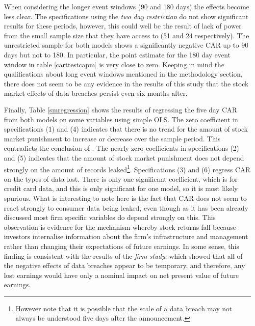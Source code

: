 \documentclass[../Main.tex]{subfiles}
\begin{document}
When considering the longer event windows (90 and 180 days) the effects become less clear. The specifications using the \textit{two day restriction} do not show significant results for these periods, however, this could well be the result of lack of power from the small sample size that they have access to (51 and 24 respectively). The unrestricted sample for both models shows a significantly negative CAR up to 90 days but not to 180. In particular, the point estimate for the 180 day event window in table \ref{carttestcapm} is very close to zero. Keeping in mind the qualifications about long event windows mentioned in the methodology section, there does not seem to be any evidence in the results of this study that the stock market effects of data breaches persist even six months after.

Finally, Table \ref{smregression} shows the results of regressing the five day CAR from both models on some variables using simple OLS. The zero coefficient in specifications (1) and (4) indicates that there is no trend for the amount of stock market punishment to increase or decrease over the sample period. This contradicts the conclusion of \cite{gordon2011}. The nearly zero coefficients in specifications (2) and (5) indicates that the amount of stock market punishment does not depend strongly on the amount of records leaked\footnote{However note that it is possible that the scale of a data breach may not always be understood five days after the announcement.}. Specifications (3) and (6) regress CAR on the types of data lost. There is only one significant coefficient, which is for credit card data, and this is only significant for one model, so it is most likely spurious. What is interesting to note here is the fact that CAR does not seem to react strongly to consumer data being leaked, even though as it has been already discussed most firm specific variables do depend strongly on this. This observation is evidence for the mechanism whereby stock returns fall because investors internalise information about the firm's infrastructure and management rather than changing their expectations of future earnings. In some sense, this finding is consistent with the results of the \textit{firm study}, which showed that all of the negative effects of data breaches appear to be temporary, and therefore, any lost earnings would have only a nominal impact on net present value of future earnings. 

\biblio %
\end{document}
